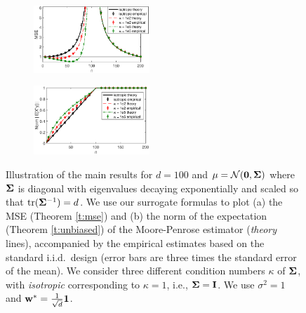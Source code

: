 \documentclass[thesis.tex]{subfiles}
\begin{document}
\begin{figure}[t]
  \centering
  \begin{subfigure}{0.49\textwidth}%
    \includegraphics[width=0.48\textwidth]{../figs/descent-intro}
  \end{subfigure}
  \hfill
  \begin{subfigure}{0.49\textwidth}
    \includegraphics[width=0.48\textwidth]{../figs/descent-shrinkage}
  \end{subfigure}
  \caption{Illustration of the main results for $d=100$ and
    $\mu=\mathcal{N}(\mathbf 0,\mathbf{\Sigma})$ where $\mathbf{\Sigma}$ is diagonal with
    eigenvalues decaying exponentially and scaled so that
    $\mathrm{tr}(\mathbf{\Sigma}^{-1})=d$. We use our surrogate
    formulas to plot (a) the MSE (Theorem \ref{t:mse}) and (b) the norm of the expectation (Theorem
    \ref{t:unbiased}) of the Moore-Penrose estimator (\emph{theory}
    lines), accompanied by the empirical estimates based on the standard
    i.i.d.~design (error bars are three times the standard error of the
    mean). We consider three different condition numbers $\kappa$ of
    $\mathbf{\Sigma}$, with \emph{isotropic} corresponding to $\kappa=1$,
    i.e., $\mathbf{\Sigma}=\mathbf I$. We use $\sigma^2=1$ and
    $\mathbf w^*=\frac1{\sqrt{d}}\mathbf 1$.}
  \label{f:intro}
\end{figure}
\end{document}
